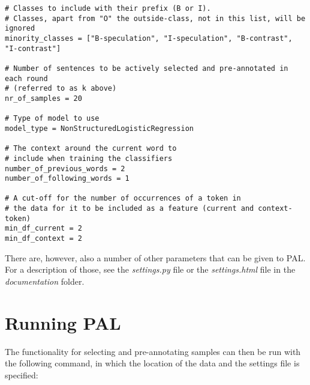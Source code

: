 \documentclass{report}
\begin{document}
{\footnotesize
\begin{verbatim}
# Classes to include with their prefix (B or I). 
# Classes, apart from "O" the outside-class, not in this list, will be ignored                                                                                                                                                                   
minority_classes = ["B-speculation", "I-speculation", "B-contrast", "I-contrast"] 

# Number of sentences to be actively selected and pre-annotated in each round
# (referred to as k above)                                                                                                  
nr_of_samples = 20

# Type of model to use                                                                                                                                    
model_type = NonStructuredLogisticRegression

# The context around the current word to 
# include when training the classifiers                
number_of_previous_words = 2
number_of_following_words = 1

# A cut-off for the number of occurrences of a token in 
# the data for it to be included as a feature (current and context-token)                                               
min_df_current = 2
min_df_context = 2
\end{verbatim}}

There are, however, also a number of other parameters that can be given to PAL. For a description of those, see the \emph{settings.py} file or the \emph{settings.html} file in the \emph{documentation} folder.


\section*{Running PAL}
The functionality for selecting and pre-annotating samples can then be run with the following command, in which the location of the data and the settings file is specified:
\end{document}
